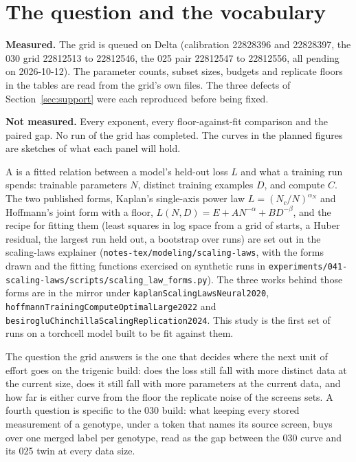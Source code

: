 
\section{The question and the vocabulary}
\label{sec:question}

\begin{keybox}
\textbf{Measured.} The grid is queued on Delta (calibration 22828396 and
22828397, the 030 grid 22812513 to 22812546, the 025 pair 22812547 to 22812556,
all pending on 2026-10-12). The parameter counts, subset sizes, budgets and
replicate floors in the tables are read from the grid's own files. The three
defects of Section~\ref{sec:support} were each reproduced before being fixed.

\textbf{Not measured.} Every exponent, every floor-against-fit comparison and
the paired gap. No run of the grid has completed. The curves in the planned
figures are sketches of what each panel will hold.
\end{keybox}

A  is a fitted relation between a model's held-out loss $L$ and
what a training run spends: trainable parameters $N$, distinct training examples
$D$, and compute $C$. The two published forms, Kaplan's single-axis power law
$L = (N_c/N)^{\alpha_N}$ and Hoffmann's joint form with a floor,
$L(N, D) = E + A N^{-\alpha} + B D^{-\beta}$, and the recipe for fitting them (least
squares in log space from a grid of starts, a Huber residual, the largest run held
out, a bootstrap over runs) are set out in the scaling-laws explainer
(\texttt{notes-tex/modeling/scaling-laws}, with the forms drawn and the fitting
functions exercised on synthetic runs in
\texttt{experiments/041-scaling-laws/scripts/scaling\_law\_forms.py}). The three
works behind those forms are in the mirror under
\texttt{kaplanScalingLawsNeural2020},
\texttt{hoffmannTrainingComputeOptimalLarge2022} and
\texttt{besirogluChinchillaScalingReplication2024}. This study is the first set of
runs on a torchcell model built to be fit against them.

The question the grid answers is the one that decides where the next unit of
effort goes on the trigenic build: does the loss still fall with more distinct
data at the current size, does it still fall with more parameters at the current
data, and how far is either curve from the floor the replicate noise of the
screens sets. A fourth question is specific to the 030 build: what keeping every
stored measurement of a genotype, under a token that names its source screen,
buys over one merged label per genotype, read as the gap between the 030 curve
and its 025 twin at every data size.


